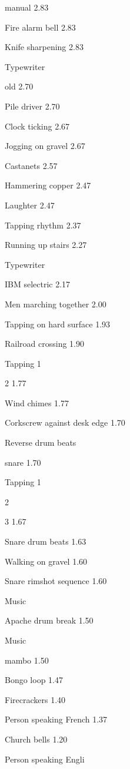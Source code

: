 \documentclass{sig-alternate-05-2015}
\begin{document}
{ manual
2.83 

 Fire alarm bell
2.83 

 Knife sharpening
2.83 

 Typewriter 

 old
2.70 

 Pile driver
2.70 

 Clock ticking
2.67 

 Jogging on gravel
2.67 

 Castanets
2.57 

 Hammering copper
2.47 

 Laughter
2.47 

 Tapping rhythm
2.37 

 Running up stairs
2.27 

 Typewriter 

 IBM selectric
2.17 

 Men marching together
2.00 

 Tapping on hard surface
1.93 

 Railroad crossing
1.90 

 Tapping 1

2
1.77 

 Wind chimes
1.77 

 Corkscrew against desk edge
1.70 

 Reverse drum beats 

 snare
1.70 

 Tapping  1

2

3
1.67 

 Snare drum beats
1.63 

 Walking on gravel
1.60 

 Snare rimshot sequence
1.60 

 Music 

 Apache drum break
1.50 

 Music 

 mambo
1.50 

 Bongo loop
1.47 

 Firecrackers
1.40 

 Person speaking French
1.37 

 Church bells
1.20 

 Person speaking Engli
}







\end{document}
